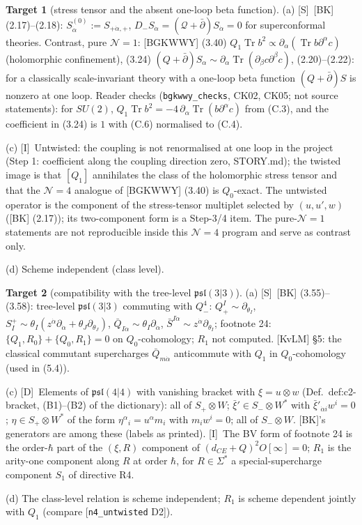 \documentclass[11pt]{article}
\theoremstyle{definition}
\newtheorem{target}{Target}
\newcommand{\Tr}{\operatorname{Tr}}
\newcommand{\Sl}{\textup{[S]}}
\newcommand{\Dl}{\textup{[D]}}
\newcommand{\Il}{\textup{[I]}}
\begin{document}
\begin{target}[stress tensor and the absent one-loop beta function]\label{t:stress}
(a) \Sl\ [BK] (2.17)--(2.18): $S^{(0)}_{\dot\alpha}:=S_{+\dot\alpha,+}$, $D_-S_{\dot\alpha}=(\mathcal Q+\bar\partial)S_{\dot\alpha}=0$ for superconformal theories. Contrast, pure $\mathcal N=1$: [BGKWWY] (3.40) $Q_1\Tr b^2\propto\partial_\alpha(\Tr b\partial^\alpha c)$ (holomorphic confinement), (3.24) $(Q+\bar\partial)S_\alpha\sim\partial_\alpha\Tr(\partial_\beta c\partial^\beta c)$, (2.20)--(2.22): for a classically scale-invariant theory with a one-loop beta function $(Q+\bar\partial)S$ is nonzero at one loop. Reader checks (\texttt{bgkwwy\_checks}, CK02, CK05; not source statements): for $SU(2)$, $Q_1\Tr b^2=-4\,\partial_\alpha\Tr(b\partial^\alpha c)$ from (C.3), and the coefficient in (3.24) is $1$ with (C.6) normalised to (C.4).

(c) \Il\ Untwisted: the coupling is not renormalised at one loop in the project (Step 1: coefficient along the coupling direction zero, STORY.md); the twisted image is that $[Q_1]$ annihilates the class of the holomorphic stress tensor and that the $\mathcal N=4$ analogue of [BGKWWY] (3.40) is $Q_0$-exact. The untwisted operator is the component of the stress-tensor multiplet selected by $(u,u',w)$ ([BK] (2.17)); its two-component form is a Step-3/4 item. The pure-$\mathcal N=1$ statements are not reproducible inside this $\mathcal N=4$ program and serve as contrast only.

(d) Scheme independent (class level).
\end{target}

\begin{target}[compatibility with the tree-level $\mathfrak{psl}(3|3)$]\label{t:psl33}
(a) \Sl\ [BK] (3.55)--(3.58): tree-level $\mathfrak{psl}(3|3)$ commuting with $Q^4_-$: $Q^I_+\sim\partial_{\theta_I}$, $S^+_I\sim\theta_I(z^{\dot\alpha}\partial_{\dot\alpha}+\theta_J\partial_{\theta_J})$, $\bar Q_{I\dot\alpha}\sim\theta_I\partial_{\dot\alpha}$, $\bar S^{I\dot\alpha}\sim z^{\dot\alpha}\partial_{\theta_I}$; footnote 24: $\{Q_1,R_0\}+\{Q_0,R_1\}=0$ on $Q_0$-cohomology; $R_1$ not computed. [KvLM] \S5: the classical commutant supercharges $\bar Q_{m\dot\alpha}$ anticommute with $Q_1$ in $Q_0$-cohomology (used in (5.4)).

(c) \Dl\ Elements of $\mathfrak{psl}(4|4)$ with vanishing bracket with $\xi=u\otimes w$ (Def.~def:c2-bracket, (B1)--(B2) of the dictionary): all of $S_+\otimes W$; $\bar\xi'\in S_-\otimes W^*$ with $\bar\xi'_{\dot\alpha i}w^i=0$; $\eta\in S_+\otimes W^*$ of the form $\eta^\alpha{}_i=u^\alpha m_i$ with $m_iw^i=0$; all of $S_-\otimes W$. [BK]'s generators are among these (labels as printed). \Il\ The BV form of footnote 24 is the order-$\hbar$ part of the $(\xi,R)$ component of $(d_{CE}+Q)^2O[\infty]=0$; $R_1$ is the arity-one component along $R$ at order $\hbar$, for $R\in\Sigma^*$ a special-supercharge component $S_1$ of directive R4.

(d) The class-level relation is scheme independent; $R_1$ is scheme dependent jointly with $Q_1$ (compare [\texttt{n4\_untwisted} D2]).
\end{target}
\end{document}
